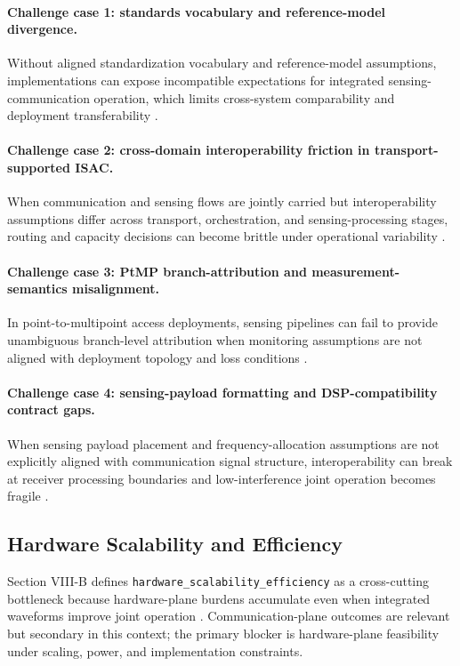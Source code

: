 \paragraph{Challenge case 1: standards vocabulary and reference-model divergence.}
Without aligned standardization vocabulary and reference-model assumptions, implementations can expose incompatible expectations for integrated sensing-communication operation, which limits cross-system comparability and deployment transferability \cite{O_ISAC_220,O_ISAC_161}.

\paragraph{Challenge case 2: cross-domain interoperability friction in transport-supported ISAC.}
When communication and sensing flows are jointly carried but interoperability assumptions differ across transport, orchestration, and sensing-processing stages, routing and capacity decisions can become brittle under operational variability \cite{O_ISAC_025}.

\paragraph{Challenge case 3: PtMP branch-attribution and measurement-semantics misalignment.}
In point-to-multipoint access deployments, sensing pipelines can fail to provide unambiguous branch-level attribution when monitoring assumptions are not aligned with deployment topology and loss conditions \cite{O_ISAC_104}.

\paragraph{Challenge case 4: sensing-payload formatting and DSP-compatibility contract gaps.}
When sensing payload placement and frequency-allocation assumptions are not explicitly aligned with communication signal structure, interoperability can break at receiver processing boundaries and low-interference joint operation becomes fragile \cite{O_ISAC_220}.

\subsection{Hardware Scalability and Efficiency}

Section VIII-B defines \texttt{hardware\_scalability\_efficiency} as a cross-cutting bottleneck because hardware-plane burdens accumulate even when integrated waveforms improve joint operation \cite{O_ISAC_035,O_ISAC_162,O_ISAC_093,O_ISAC_171}. Communication-plane outcomes are relevant but secondary in this context; the primary blocker is hardware-plane feasibility under scaling, power, and implementation constraints.

